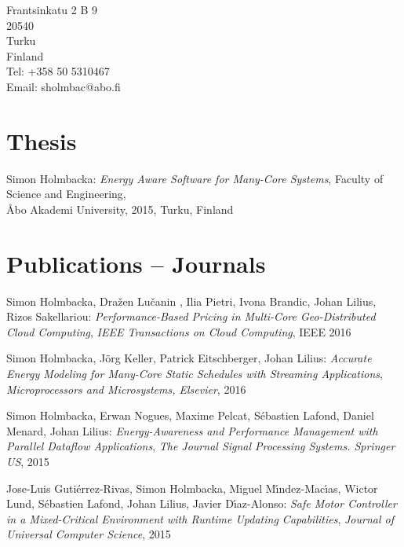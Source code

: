\documentclass[margin,line]{resume}
\begin{document}
\begin{resume}
\small{
    Frantsinkatu 2 B 9			\vspace{0mm}\\\vspace{0mm}%
    20540				\vspace{0mm}\\\vspace{0mm}%
    Turku				\vspace{0mm}\\\vspace{0mm}%
    Finland				\vspace{0mm}\\\vspace{0mm}%
    Tel: +358 50 5310467		\vspace{0mm}\\\vspace{0mm}%
    Email: sholmbac@abo.fi		\vspace{0mm}\\\vspace{-4.5mm}%
    }

\section{\mysidestyle Thesis}    
Simon Holmbacka:
\textit{Energy Aware Software for Many-Core Systems},
Faculty of Science and Engineering,\\ \AA{}bo Akademi University, 2015, Turku, Finland

\section{\mysidestyle Publications -- Journals}
Simon Holmbacka, Dra\v{z}en Lu\v{c}anin , Ilia Pietri, Ivona Brandic, Johan Lilius, Rizos Sakellariou:
\textit{Performance-Based Pricing in Multi-Core Geo-Distributed Cloud Computing}, 
\textsl{IEEE Transactions on Cloud Computing}, IEEE 2016

Simon Holmbacka, J\"{o}rg Keller, Patrick Eitschberger, Johan Lilius:
\textit{Accurate Energy Modeling for Many-Core Static Schedules with Streaming Applications}, 
\textsl{Microprocessors and Microsystems, Elsevier}, 2016

Simon Holmbacka, Erwan Nogues, Maxime Pelcat, S\'{e}bastien Lafond, Daniel Menard, Johan Lilius:
\textit{Energy-Awareness and Performance Management with Parallel Dataflow Applications}, 
\textsl{The Journal Signal Processing Systems. Springer US}, 2015

Jose-Luis Guti\'{e}rrez-Rivas, Simon Holmbacka, Miguel M\'{\i}ndez-Mac\'{\i}as, Wictor Lund, S\'{e}bastien Lafond, Johan Lilius, Javier D\'{\i}az-Alonso:
\textit{Safe Motor Controller in a Mixed-Critical Environment with Runtime Updating Capabilities}, 
\textsl{Journal of Universal Computer Science}, 2015


\end{resume}
\end{document}
